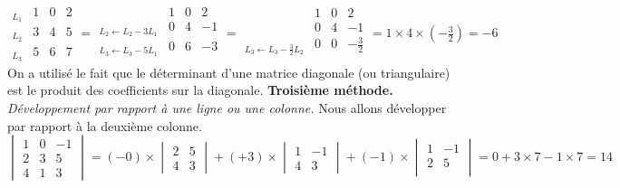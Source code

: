 {{$$ \begin{array}{l|ccc|}
    _{L_1} & 1 & 0 & 2 \\
    _{L_2} & 3 & 4 & 5\\
    _{L_3} & 5 & 6  & 7
  \end{array}
= \begin{array}{l|ccc|}
    & 1 & 0 & 2  \\
    _{L_2 \leftarrow L_2-3L_1} & 0 & 4 & -1 \\
    _{L_3 \leftarrow L_3-5L_1} & 0 & 6  & -3 \\
  \end{array}
= \begin{array}{l|ccc|}
    & 1 & 0 & 2 \\
    & 0 & 4 & -1 \\
    _{L_3 \leftarrow L_3-\frac32 L_2} & 0 & 0  & -\frac32 \\
  \end{array} = 1\times 4 \times (-\tfrac32) = -6
$$
On a utilisé le fait  que le déterminant d'une matrice diagonale (ou triangulaire) est le produit
des coefficients sur la diagonale.
\textbf{Troisième méthode.} \emph{Développement par rapport à une ligne ou une colonne.}
Nous allons développer par rapport à la deuxième colonne. 
$$\begin{vmatrix}
    1 & 0 & -1 \\
    2 & 3 & 5  \\
    4 & 1 & 3
  \end{vmatrix}
= (-0) \times \begin{vmatrix}
    2 & 5  \\
    4 & 3
  \end{vmatrix}
+ (+3)\times \begin{vmatrix}
    1 & -1 \\
    4 & 3
  \end{vmatrix}
+ (-1) \times \begin{vmatrix}
    1 & -1 \\
    2 & 5  \\
  \end{vmatrix}
= 0 + 3 \times 7 - 1  \times 7 = 14$$


}}
